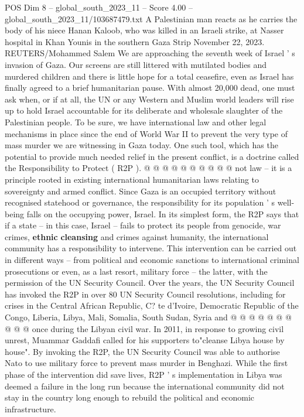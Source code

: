 \begin{textsample}{POS Dim 8 – global\_south\_2023\_11 – Score 4.00 – global\_south\_2023\_11/103687479.txt}  \label{ex:f8_pos_364}
A Palestinian man reacts as he carries the body of his niece Hanan Kaloob, who was killed in an Israeli strike, at Nasser hospital in Khan Younis in the southern Gaza Strip November 22, 2023.
REUTERS/Mohammed Salem We are approaching the seventh week of Israel ' s invasion of Gaza.
Our screens are still littered with mutilated bodies and murdered children and there is little hope for a total ceasefire, even as Israel has finally agreed to a brief humanitarian pause.
With almost 20,000 dead, one must ask when, or if at all, the UN or any Western and Muslim world leaders will rise up to hold Israel accountable for its deliberate and wholesale slaughter of the Palestinian people.
To be sure, we have international law and other legal mechanisms in place since the end of World War II to prevent the very type of mass murder we are witnessing in Gaza today.
One such tool, which has the potential to provide much needed relief in the present conflict, is a doctrine called the Responsibility to Protect ( R2P ). @ @ @ @ @ @ @ @ @ @ not law -- it is a principle rooted in existing international humanitarian laws relating to sovereignty and armed conflict.
Since Gaza is an occupied territory without recognised statehood or governance, the responsibility for its population ' s well-being falls on the occupying power, Israel.
In its simplest form, the R2P says that if a state -- in this case, Israel -- fails to protect its people from genocide, war crimes, \textbf{ethnic} \textbf{cleansing} and crimes against humanity, the international community has a responsibility to intervene.
This intervention can be carried out in different ways -- from political and economic sanctions to international criminal prosecutions or even, as a last resort, military force -- the latter, with the permission of the UN Security Council.
Over the years, the UN Security Council has invoked the R2P in over 80 UN Security Council resolutions, including for crises in the Central African Republic, C? te d'Ivoire, Democratic Republic of the Congo, Liberia, Libya, Mali, Somalia, South Sudan, Syria and @ @ @ @ @ @ @ @ @ @ once during the Libyan civil war.
In 2011, in response to growing civil unrest, Muammar Gaddafi called for his supporters to"cleanse Libya house by house".
By invoking the R2P, the UN Security Council was able to authorise Nato to use military force to prevent mass murder in Benghazi.
While the first phase of the intervention did save lives, R2P ' s implementation in Libya was deemed a failure in the long run because the international community did not stay in the country long enough to rebuild the political and economic infrastructure.

\end{textsample}
